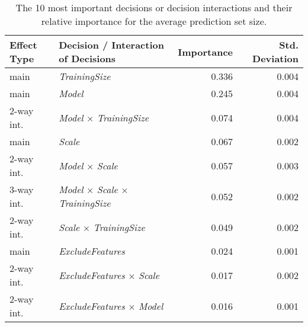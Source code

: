 \begin{table}
\centering
\caption{The 10 most important decisions or decision interactions and their relative importance for the average prediction set size.}
\label{tab:fanova_top10}
\begin{tabular}{llrr}
\toprule
Effect Type &                                   Decision / Interaction of Decisions &  Importance &  Std. Deviation \\
\midrule
       main &                                                 \textit{TrainingSize} &       0.336 &           0.004 \\
       main &                                                        \textit{Model} &       0.245 &           0.004 \\
 2-way int. &                         \textit{Model} $\times$ \textit{TrainingSize} &       0.074 &           0.004 \\
       main &                                                        \textit{Scale} &       0.067 &           0.002 \\
 2-way int. &                                \textit{Model} $\times$ \textit{Scale} &       0.057 &           0.003 \\
 3-way int. & \textit{Model} $\times$ \textit{Scale} $\times$ \textit{TrainingSize} &       0.052 &           0.002 \\
 2-way int. &                         \textit{Scale} $\times$ \textit{TrainingSize} &       0.049 &           0.002 \\
       main &                                              \textit{ExcludeFeatures} &       0.024 &           0.001 \\
 2-way int. &                      \textit{ExcludeFeatures} $\times$ \textit{Scale} &       0.017 &           0.002 \\
 2-way int. &                      \textit{ExcludeFeatures} $\times$ \textit{Model} &       0.016 &           0.001 \\
\bottomrule
\end{tabular}
\end{table}
